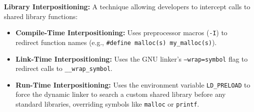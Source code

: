 \begin{remark}
    \textbf{Library Interpositioning:} A technique allowing developers to intercept calls to shared library functions:
    \begin{itemize}
        \item \textbf{Compile-Time Interpositioning:} Uses preprocessor macros (\texttt{-I}) to redirect function names (e.g., \texttt{\#define malloc(s) my\_malloc(s)}).
        \item \textbf{Link-Time Interpositioning:} Uses the GNU linker's \texttt{--wrap=symbol} flag to redirect calls to \texttt{\_\_wrap\_symbol}.
        \item \textbf{Run-Time Interpositioning:} Uses the environment variable \texttt{LD\_PRELOAD} to force the dynamic linker to search a custom shared library before any standard libraries, overriding symbols like \texttt{malloc} or \texttt{printf}.
    \end{itemize}
\end{remark}